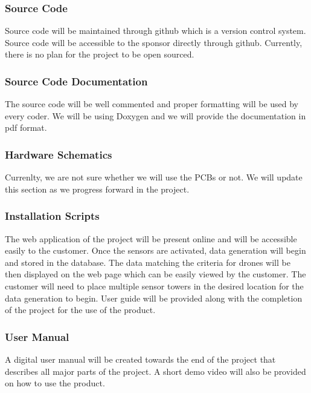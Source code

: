 \subsubsection{Source Code}
Source code will be maintained through github which is a version control system. Source code will be accessible to the sponsor directly through github. Currently, there is no plan for the project to be open sourced.

\subsubsection{Source Code Documentation}
The source code will be well commented and proper formatting will be used by every coder. We will be using Doxygen and we will provide the documentation in pdf format.

\subsubsection{Hardware Schematics}
Currenlty, we are not sure whether we will use the PCBs or not. We will update this section as we progress forward in the project. 

\subsubsection{Installation Scripts}
The web application of the project will be present online and will be accessible easily to the customer. Once the sensors are activated, data generation will begin and stored in the database. The data matching the criteria for drones will be then displayed on the web page which can be easily viewed by the customer. The customer will need to place multiple sensor towers in the desired location for the data generation to begin. User guide will be provided along with the completion of the project for the use of the product.  

\subsubsection{User Manual}
A digital user manual will be created towards the end of the project that describes all major parts of the project. A short demo video will also be provided on how to use the product.
